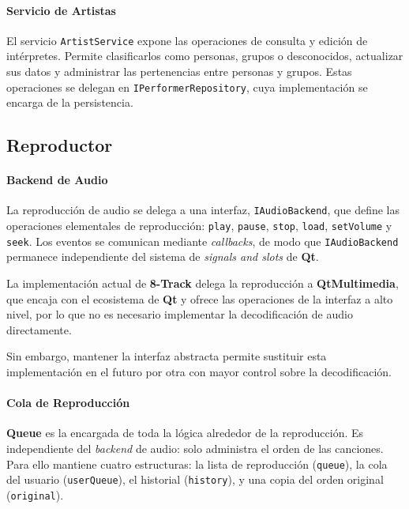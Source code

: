 \paragraph{Servicio de Artistas}

El servicio \texttt{ArtistService} expone las operaciones de consulta y edición de intérpretes. Permite clasificarlos
como personas, grupos o desconocidos, actualizar sus datos y administrar las pertenencias entre personas y grupos.
Estas operaciones se delegan en \texttt{IPerformerRepository}, cuya implementación se encarga de la persistencia.

\subsection{Reproductor}

\paragraph{Backend de Audio}

La reproducción de audio se delega a una interfaz, \texttt{IAudioBackend}, que define las operaciones elementales
de reproducción: \texttt{play}, \texttt{pause}, \texttt{stop}, \texttt{load}, \texttt{setVolume} y \texttt{seek}.
Los eventos se comunican mediante \textit{callbacks}, de modo que \texttt{IAudioBackend} permanece independiente
del sistema de \textit{signals and slots} de \textbf{Qt}.

La implementación actual de \textbf{8-Track} delega la reproducción a \textbf{QtMultimedia}, que encaja con
el ecosistema de \textbf{Qt} y ofrece las operaciones de la interfaz a alto nivel, por lo que no es necesario
implementar la decodificación de audio directamente.

Sin embargo, mantener la interfaz abstracta permite sustituir esta implementación en el futuro por otra
con mayor control sobre la decodificación.

\paragraph{Cola de Reproducción}

\textbf{Queue} es la encargada de toda la lógica alrededor de la reproducción. Es independiente del
\textit{backend} de audio: solo administra el orden de las canciones. Para ello mantiene cuatro
estructuras: la lista de reproducción (\texttt{queue}), la cola del usuario (\texttt{userQueue}),
el historial (\texttt{history}), y una copia del orden original (\texttt{original}).

